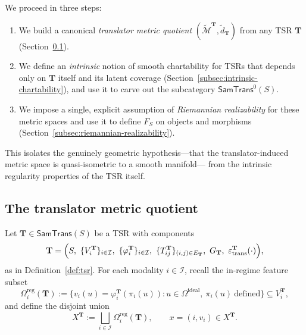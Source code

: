 \documentclass[11pt]{article}
\newcommand{\SamTrans}{\mathsf{SamTrans}}
\begin{document}
We proceed in three steps:
\begin{enumerate}
  \item We build a canonical \emph{translator metric quotient}
        $(\widetilde{\mathcal{M}}^{\mathbf{T}}, \tilde d_{\mathbf{T}})$
        from any TSR $\mathbf{T}$ (Section~\ref{subsec:translator-metric-quotient}).
  \item We define an \emph{intrinsic} notion of smooth chartability for TSRs
        that depends only on $\mathbf{T}$ itself and its latent coverage
        (Section~\ref{subsec:intrinsic-chartability}),
        and use it to carve out the subcategory $\SamTrans^0(S)$.
  \item We impose a single, explicit assumption of \emph{Riemannian
        realizability} for these metric spaces and use it to define $F_S$
        on objects and morphisms (Section~\ref{subsec:riemannian-realizability}).
\end{enumerate}
This isolates the genuinely geometric hypothesis---that the
translator-induced metric space is quasi-isometric to a smooth manifold---
from the intrinsic regularity properties of the TSR itself.

\subsection{The translator metric quotient}
\label{subsec:translator-metric-quotient}

Let $\mathbf{T} \in \SamTrans(S)$ be a TSR with components
\[
\mathbf{T}
=
\Bigl(
  S,\ \{V_i^{\mathbf{T}}\}_{i \in \mathcal{I}},\ 
  \{\varphi_i^{\mathbf{T}}\}_{i \in \mathcal{I}},\
  \{T_{ij}^{\mathbf{T}}\}_{(i,j) \in E_{\mathbf{T}}},\
  G_{\mathbf{T}},\ \varepsilon_{\mathrm{trans}}^{\mathbf{T}}(\cdot)
\Bigr),
\]
as in Definition~\ref{def:tsr}.  For each modality $i \in \mathcal{I}$,
recall the in-regime feature subset
\[
\Omega_i^{\mathrm{reg}}(\mathbf{T})
:= 
\bigl\{
  v_i(u) = \varphi_i^{\mathbf{T}}(\pi_i(u)) :
  u \in \Omega^{\mathrm{ideal}},\ \pi_i(u)\ \text{defined}
\bigr\}
\subseteq V_i^{\mathbf{T}},
\]
and define the disjoint union
\[
X^{\mathbf{T}}
:=
\bigsqcup_{i \in \mathcal{I}}
\Omega_i^{\mathrm{reg}}(\mathbf{T}),
\qquad
x = (i, v_i) \in X^{\mathbf{T}}.
\]
\end{document}
